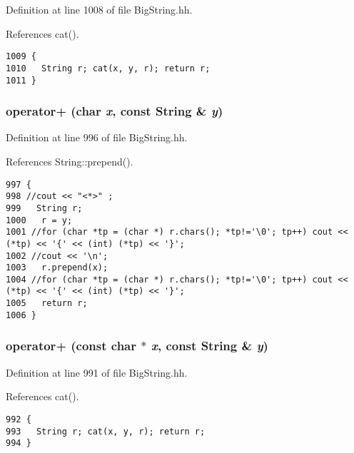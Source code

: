 Definition at line 1008 of file Big\-String.hh.

References cat().



\footnotesize\begin{verbatim}1009 {
1010   String r; cat(x, y, r); return r;
1011 }
\end{verbatim}\normalsize 
{}
\subsubsection{ operator+ (char {\em x}, const {\bf String} \& {\em y})\hspace{0.3cm}{\tt  [inline]}}\label{BigString_8hh_a79}




Definition at line 996 of file Big\-String.hh.

References String::prepend().



\footnotesize\begin{verbatim}997 {
998 //cout << "<*>" ;
999   String r;
1000   r = y;
1001 //for (char *tp = (char *) r.chars(); *tp!='\0'; tp++) cout << (*tp) << '{' << (int) (*tp) << '}';
1002 //cout << '\n';
1003   r.prepend(x);
1004 //for (char *tp = (char *) r.chars(); *tp!='\0'; tp++) cout << (*tp) << '{' << (int) (*tp) << '}';
1005   return r;
1006 }
\end{verbatim}\normalsize 
{}
\subsubsection{ operator+ (const char $\ast$ {\em x}, const {\bf String} \& {\em y})\hspace{0.3cm}{\tt  [inline]}}\label{BigString_8hh_a78}




Definition at line 991 of file Big\-String.hh.

References cat().



\footnotesize\begin{verbatim}992 {
993   String r; cat(x, y, r); return r;
994 }
\end{verbatim}\normalsize 
{}
